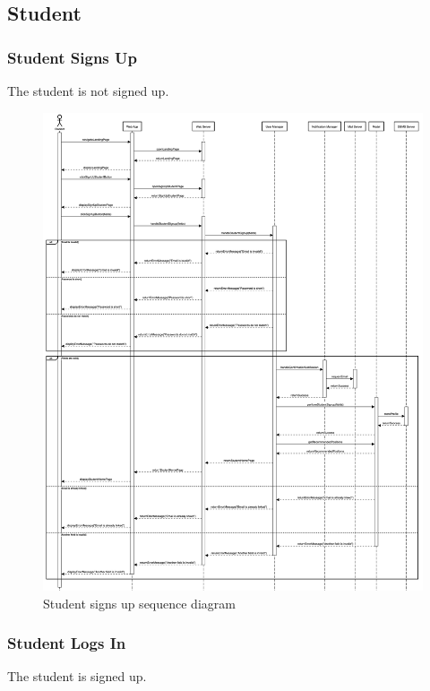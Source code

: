 \newpage
\subsection{Student}
\subsubsection{Student Signs Up}
The student is not signed up.

\begin{figure}[h!]
    \centering
    \includegraphics[width=14cm]{images/sequence-diagrams/student-signs-up.png}
    \caption{Student signs up sequence diagram}
\end{figure}

\newpage
\subsubsection{Student Logs In}
The student is signed up.

